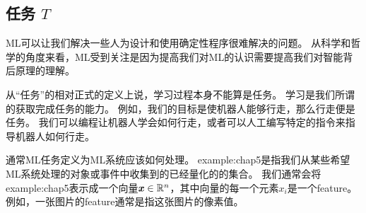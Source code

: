 \subsection{任务 $T$}
\label{sec:the_task_t}
\gls{ML}可以让我们解决一些人为设计和使用确定性程序很难解决的问题。
从科学和哲学的角度来看，\gls{ML}受到关注是因为提高我们对\gls{ML}的认识需要提高我们对智能背后原理的理解。


从``任务''的相对正式的定义上说，学习过程本身不能算是任务。
学习是我们所谓的获取完成任务的能力。
例如，我们的目标是使机器人能够行走，那么行走便是任务。
我们可以编程让机器人学会如何行走，或者可以人工编写特定的指令来指导机器人如何行走。


通常\gls{ML}任务定义为\gls{ML}系统应该如何处理。
\gls{example:chap5}是指我们从某些希望\gls{ML}系统处理的对象或事件中收集到的已经量化的的集合。
我们通常会将\gls{example:chap5}表示成一个向量$\boldsymbol{\mathit{x}}\in\mathbb{R}^n$，其中向量的每一个元素$x_i$是一个\gls{feature}。
例如，一张图片的\gls{feature}通常是指这张图片的像素值。


